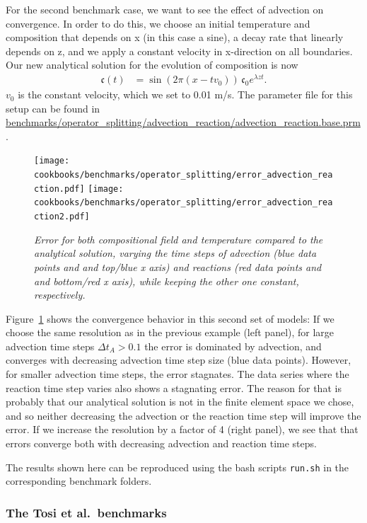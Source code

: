 \documentclass{article}
\begin{document}
For the second benchmark case, we want to see the effect of advection on convergence. 
In order to do this, we choose an initial temperature and composition that depends on x (in this case a sine), a decay rate that linearly depends on z, and we apply a constant velocity in x-direction on all boundaries. Our new analytical solution for the evolution of composition is now
 \begin{align}
  \mathfrak{c}(t) 
  &=
  \sin (2\pi(x-t v_0)) \, \mathfrak{c}_0 e^{\lambda z t}.
\end{align}
$v_0$ is the constant velocity, which we set to 0.01 m/s. 
The parameter file for this setup can be found in \url{benchmarks/operator_splitting/advection_reaction/advection_reaction.base.prm}. 
\begin{figure}
  \begin{center}
    \texttt{[image: cookbooks/benchmarks/operator\_splitting/error\_advection\_reaction.pdf]}
    \texttt{[image: cookbooks/benchmarks/operator\_splitting/error\_advection\_reaction2.pdf]}
  \end{center}
  \caption{\it Error for both compositional field and temperature compared to the analytical solution, varying the time steps of advection (blue data points and and top/blue x axis) and reactions (red data points and and bottom/red x axis), while keeping the other one constant, respectively.}
  \label{fig:advection-reaction}
\end{figure}
Figure~\ref{fig:advection-reaction} shows the convergence behavior in this second set of models: 
If we choose the same resolution as in the previous example (left panel), for large advection time steps $\Delta t_A > 0.1$ the error is dominated by advection, and converges with decreasing advection time step size (blue data points). However, for smaller advection time steps, the error stagnates. The data series where the reaction time step varies also shows a stagnating error. The reason for that is probably that our analytical solution is not in the finite element space we chose, and so neither decreasing the advection or the reaction time step will improve the error. 
If we increase the resolution by a factor of 4 (right panel), we see that that errors converge both with decreasing advection and reaction time steps.  

The results shown here can be reproduced using the bash scripts \texttt{run.sh} in the corresponding benchmark folders. 

\subsubsection{The Tosi et al.~benchmarks}
\label{sec:benchmark-tosii}
\end{document}
